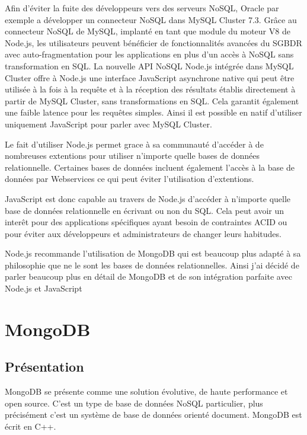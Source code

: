 Afin d'éviter la fuite des développeurs vers des serveurs NoSQL, Oracle par exemple a développer un connecteur NoSQL dans MySQL Cluster 7.3.
Grâce au connecteur NoSQL de MySQL, implanté en tant que module du moteur V8 de Node.js, les utilisateurs peuvent bénéficier de fonctionnalités avancées du SGBDR avec auto-fragmentation pour les applications en plus d’un accès à NoSQL sans transformation en SQL.
La nouvelle API NoSQL Node.js intégrée dans MySQL Cluster offre à Node.js une interface JavaScript asynchrone native qui peut être utilisée à la fois à la requête et à la réception des résultats établis directement à partir de MySQL Cluster, sans transformations en SQL. Cela garantit également une faible latence pour les requêtes simples. Ainsi il est possible en natif d'utiliser uniquement JavaScript pour parler avec MySQL Cluster.

Le fait d'utiliser Node.js permet grace à sa communauté d'accéder à de nombreuses extentions pour utiliser n'importe quelle bases de données relationnelle.
Certaines bases de données incluent également l'accès à la base de données par Webservices ce qui peut éviter l'utilisation d'extentions.

JavaScript est donc capable au travers de Node.js d'accéder à n'importe quelle base de données relationnelle en écrivant ou non du SQL. Cela peut avoir un interêt pour des applications spécifiques ayant besoin de contraintes ACID ou pour éviter aux développeurs et administrateurs de changer leurs habitudes.

Node.js recommande l'utilisation de MongoDB qui est beaucoup plus adapté à sa philosophie que ne le sont les bases de données relationnelles. Ainsi j'ai décidé de parler beaucoup plus en détail de MongoDB et de son intégration parfaite avec Node.js et JavaScript


\section{MongoDB}
\label{ch:mongodb}

\subsection{Présentation}

MongoDB se présente comme une solution évolutive, de haute performance et open source. C’est un type de base de données NoSQL particulier, plus précisément c’est un système de base de données orienté document. MongoDB est écrit en C++.

